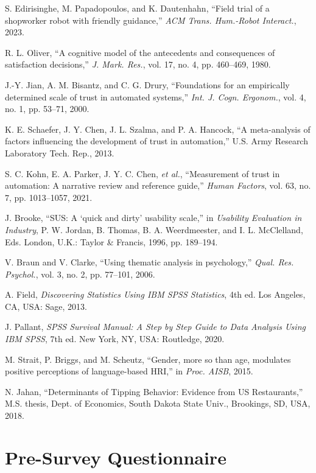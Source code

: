 \documentclass[conference]{IEEEtran}
\begin{document}
\begin{thebibliography}{35}
 S. Edirisinghe, M. Papadopoulos, and K. Dautenhahn, “Field trial of a shopworker robot with friendly guidance,” \textit{ACM Trans. Hum.-Robot Interact.}, 2023.

 R. L. Oliver, “A cognitive model of the antecedents and consequences of satisfaction decisions,” \textit{J. Mark. Res.}, vol. 17, no. 4, pp. 460–469, 1980.

 J.-Y. Jian, A. M. Bisantz, and C. G. Drury, “Foundations for an empirically determined scale of trust in automated systems,” \textit{Int. J. Cogn. Ergonom.}, vol. 4, no. 1, pp. 53–71, 2000.

 K. E. Schaefer, J. Y. Chen, J. L. Szalma, and P. A. Hancock, “A meta-analysis of factors influencing the development of trust in automation,” U.S. Army Research Laboratory Tech. Rep., 2013.

 S. C. Kohn, E. A. Parker, J. Y. C. Chen, \textit{et al.}, “Measurement of trust in automation: A narrative review and reference guide,” \textit{Human Factors}, vol. 63, no. 7, pp. 1013–1057, 2021.

 J. Brooke, “SUS: A ‘quick and dirty’ usability scale,” in \textit{Usability Evaluation in Industry}, P. W. Jordan, B. Thomas, B. A. Weerdmeester, and I. L. McClelland, Eds. London, U.K.: Taylor \& Francis, 1996, pp. 189–194.

 V. Braun and V. Clarke, “Using thematic analysis in psychology,” \textit{Qual. Res. Psychol.}, vol. 3, no. 2, pp. 77–101, 2006.

 A. Field, \textit{Discovering Statistics Using IBM SPSS Statistics}, 4th ed. Los Angeles, CA, USA: Sage, 2013.

 J. Pallant, \textit{SPSS Survival Manual: A Step by Step Guide to Data Analysis Using IBM SPSS}, 7th ed. New York, NY, USA: Routledge, 2020.

 M. Strait, P. Briggs, and M. Scheutz, “Gender, more so than age, modulates positive perceptions of language-based HRI,” in \textit{Proc. AISB}, 2015.

 N. Jahan, “Determinants of Tipping Behavior: Evidence from US Restaurants,” M.S. thesis, Dept. of Economics, South Dakota State Univ., Brookings, SD, USA, 2018.


\end{thebibliography}


\appendices

\section{Pre-Survey Questionnaire}
\end{document}
